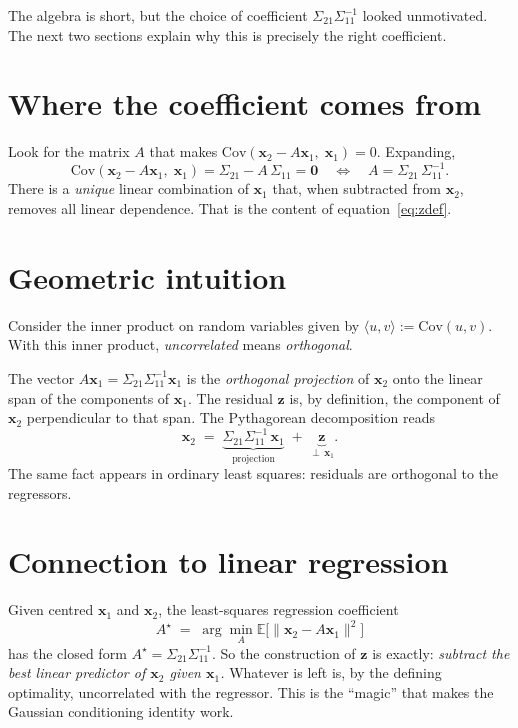 \documentclass[11pt]{article}
\begin{document}
The algebra is short, but the choice of coefficient
$\Sigma_{21}\Sigma_{11}^{-1}$ looked unmotivated. The next two sections
explain why this is precisely the right coefficient.

\section*{Where the coefficient comes from}

Look for the matrix $A$ that makes
$\mathrm{Cov}(\bm{x}_2 - A\bm{x}_1,\; \bm{x}_1) = 0$. Expanding,
\[
  \mathrm{Cov}(\bm{x}_2 - A\bm{x}_1,\; \bm{x}_1)
  = \Sigma_{21} - A\,\Sigma_{11} = \bm{0}
  \quad\Longleftrightarrow\quad
  A = \Sigma_{21}\,\Sigma_{11}^{-1}.
\]
There is a \emph{unique} linear combination of $\bm{x}_1$ that, when
subtracted from $\bm{x}_2$, removes all linear dependence. That is the
content of equation~\eqref{eq:zdef}.

\section*{Geometric intuition}

Consider the inner product on random variables given by
$\langle u, v\rangle := \mathrm{Cov}(u, v)$. With this inner product,
\emph{uncorrelated} means \emph{orthogonal}.

The vector $A\bm{x}_1 = \Sigma_{21}\Sigma_{11}^{-1}\bm{x}_1$ is the
\emph{orthogonal projection} of $\bm{x}_2$ onto the linear span of the
components of $\bm{x}_1$. The residual $\bm{z}$ is, by definition, the
component of $\bm{x}_2$ perpendicular to that span. The Pythagorean
decomposition reads
\[
  \bm{x}_2 \;=\; \underbrace{\Sigma_{21}\Sigma_{11}^{-1}\,\bm{x}_1}_{\text{projection}} \;+\; \underbrace{\bm{z}}_{\perp \,\bm{x}_1}.
\]
The same fact appears in ordinary least squares: residuals are
orthogonal to the regressors.

\section*{Connection to linear regression}

Given centred $\bm{x}_1$ and $\bm{x}_2$, the least-squares regression
coefficient
\[
  A^\star \;=\; \arg\min_A \mathbb{E}\bigl[\|\bm{x}_2 - A\bm{x}_1\|^2\bigr]
\]
has the closed form $A^\star = \Sigma_{21}\Sigma_{11}^{-1}$. So the
construction of $\bm{z}$ is exactly: \emph{subtract the best linear
predictor of $\bm{x}_2$ given $\bm{x}_1$.} Whatever is left is, by the
defining optimality, uncorrelated with the regressor. This is the
``magic'' that makes the Gaussian conditioning identity work.
\end{document}

